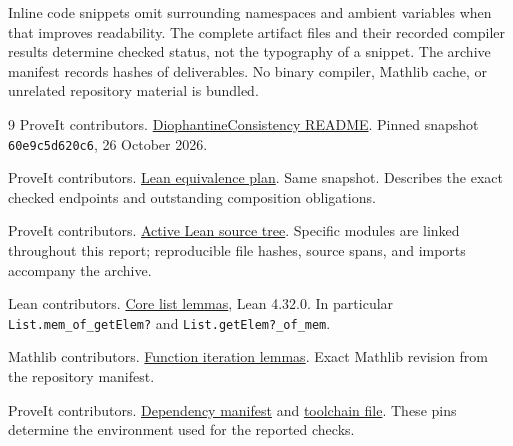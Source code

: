 \documentclass[11pt,letterpaper]{article}
\newcommand{\code}[1]{\nolinkurl{#1}}
\begin{document}
Inline code snippets omit surrounding namespaces and ambient variables when
that improves readability. The complete artifact files and their recorded
compiler results determine checked status, not the typography of a snippet.
The archive manifest records hashes of deliverables. No binary compiler,
Mathlib cache, or unrelated repository material is bundled.

\begin{thebibliography}{9}
ProveIt contributors.
\href{https://github.com/VladimirReshetnikov/ProveIt/blob/60e9c5d620c6c387d932876cfa2d9376f64ea56c/Computability/DiophantineConsistency/README.md}{DiophantineConsistency README}.
Pinned snapshot \code{60e9c5d620c6}, 26 October 2026.

ProveIt contributors.
\href{https://github.com/VladimirReshetnikov/ProveIt/blob/60e9c5d620c6c387d932876cfa2d9376f64ea56c/Computability/DiophantineConsistency/LEAN_EQUIVALENCE_PLAN.md}{Lean equivalence plan}.
Same snapshot. Describes the exact checked endpoints and outstanding composition
obligations.

ProveIt contributors.
\href{https://github.com/VladimirReshetnikov/ProveIt/tree/60e9c5d620c6c387d932876cfa2d9376f64ea56c/Computability/DiophantineConsistency/Lean}{Active Lean source tree}.
Specific modules are linked throughout this report; reproducible file hashes,
source spans, and imports accompany the archive.

Lean contributors.
\href{https://github.com/leanprover/lean4/blob/8c9756b28d64dab099da31a4c09229a9e6a2ef35/src/Init/Data/List/Lemmas.lean}{Core list lemmas},
Lean 4.32.0. In particular \code{List.mem_of_getElem?} and
\code{List.getElem?_of_mem}.

Mathlib contributors.
\href{https://github.com/leanprover-community/mathlib4/blob/81a5d257c8e410db227a6665ed08f64fea08e997/Mathlib/Logic/Function/Iterate.lean}{Function iteration lemmas}.
Exact Mathlib revision from the repository manifest.

ProveIt contributors.
\href{https://github.com/VladimirReshetnikov/ProveIt/blob/60e9c5d620c6c387d932876cfa2d9376f64ea56c/lake-manifest.json}{Dependency manifest}
and
\href{https://github.com/VladimirReshetnikov/ProveIt/blob/60e9c5d620c6c387d932876cfa2d9376f64ea56c/lean-toolchain}{toolchain file}.
These pins determine the environment used for the reported checks.
\end{thebibliography}
\end{document}

